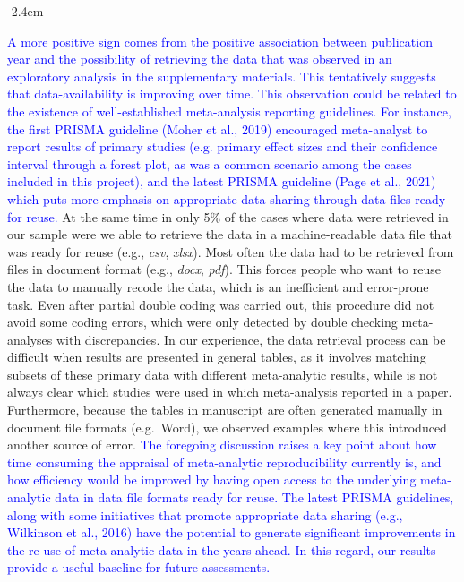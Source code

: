 \documentclass[draft]{article}
\renewenvironment{quote}{\begin{fquote}\advance\leftmargini -2.4em\begin{oldquote}}{\end{oldquote}\end{fquote}}
\newenvironment{fquote}
  {\def\FrameCommand{
	\fboxsep=0.6em %
	\fcolorbox{black}{white}}%
    \MakeFramed {\advance\hsize-2\width \FrameRestore}
    \begin{minipage}{\linewidth}
  }
  {\end{minipage}\endMakeFramed}
\begin{document}
\begin{quote}
\textcolor{blue}{A more positive sign comes from the positive association between publication year and the possibility of retrieving the data that was observed in an exploratory analysis in the supplementary materials. This tentatively suggests that data-availability is improving over time. This observation could be related to the existence of well-established meta-analysis reporting guidelines. For instance, the first PRISMA guideline (Moher et al., 2019)} \textcolor{blue}{encouraged meta-analyst to report results of primary studies (e.g. primary effect sizes and their confidence interval through a forest plot, as was a common scenario among the cases included in this project), and the latest PRISMA guideline (Page et al., 2021)} \textcolor{blue}{which puts more emphasis on appropriate data sharing through data files ready for reuse.} At the same time in only 5\% of the cases where data were retrieved in our sample were we able to retrieve the data in a machine-readable data file that was ready for reuse (e.g., \emph{csv}, \emph{xlsx}). Most often the data had to be retrieved from files in document format (e.g., \emph{docx}, \emph{pdf}). This forces people who want to reuse the data to manually recode the data, which is an inefficient and error-prone task. Even after partial double coding was carried out, this procedure did not avoid some coding errors, which were only detected by double checking meta-analyses with discrepancies. In our experience, the data retrieval process can be difficult when results are presented in general tables, as it involves matching subsets of these primary data with different meta-analytic results, while is not always clear which studies were used in which meta-analysis reported in a paper. Furthermore, because the tables in manuscript are often generated manually in document file formats (e.g.~Word), we observed examples where this introduced another source of error. \textcolor{blue}{The foregoing discussion raises a key point about how time consuming the appraisal of meta-analytic reproducibility currently is, and how efficiency would be improved by having open access to the underlying meta-analytic data in data file formats ready for reuse. The latest PRISMA guidelines, along with some initiatives that promote appropriate data sharing (e.g., Wilkinson et al., 2016)} \textcolor{blue}{have the potential to generate significant improvements in the re-use of meta-analytic data in the years ahead. In this regard, our results provide a useful baseline for future assessments.}
\end{quote}
\end{document}

